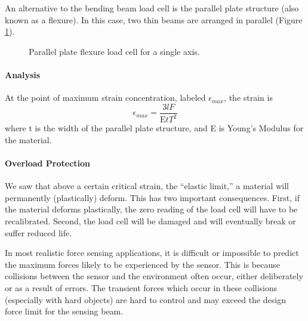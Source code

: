 An alternative to the bending beam load cell is the parallel plate
structure (also known as a flexure).  In this case, two thin beams
are arranged in parallel (Figure \ref{Parallel}).
\begin{figure}[ht]	%
\begin{center}
\caption{ Parallel plate flexure load cell for a single axis.}\label{Parallel}	%
\end{center}
\end{figure}	%

\paragraph{Analysis}
At the point of maximum strain concentration, labeled $\epsilon_{max}$,
the strain is
\[
\epsilon_{max} = \frac{3lF}{\mathrm{E}tT^2}
\]
where t is the width of the parallel plate structure, and E is
Young's Modulus for the material.

\paragraph{Overload Protection}
We saw that above a certain critical strain, the ``elastic limit,''
a material will permanently (plastically) deform.  This has two important
consequences. First, if the material deforms plastically, the zero
reading of the load cell will have to be recalibrated. Second, the
load cell will be damaged and will eventually break or suffer reduced
life.

In most realistic force sensing applications, it is difficult or impossible
to predict the maximum forces likely to be experienced by the sensor.
This is because collisions between the sensor and the environment
often occur, either deliberately or as a result of errors. The transient
forces which occur in these collisions (especially with hard objects)
are hard to control and may exceed the design force limit for the sensing
beam.

